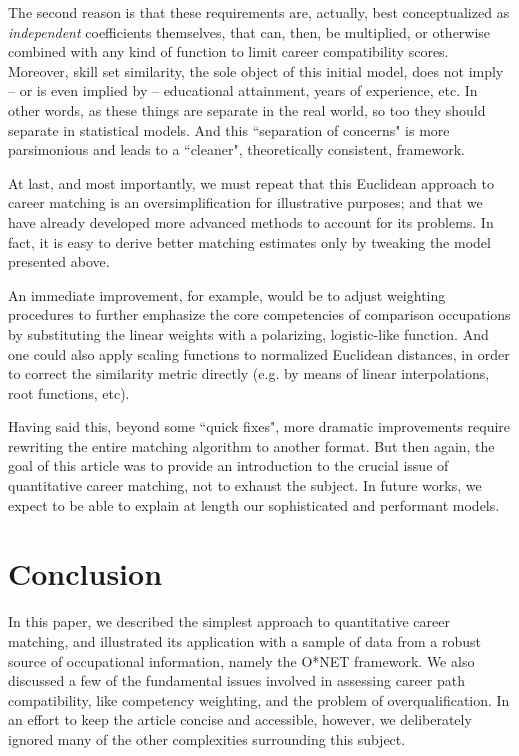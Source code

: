 \documentclass{article}
\begin{document}
The second reason is that these requirements are, actually, best conceptualized
as \textit{independent} coefficients themselves, that can, then, be multiplied,
or otherwise combined with any kind of function to limit career compatibility
scores. Moreover, skill set similarity, the sole object of this initial model,
does not imply -- or is even implied by -- educational attainment, years of
experience, etc. In other words, as these things are separate in the real
world, so too they should separate in statistical models. And this ``separation
of concerns" is more parsimonious and leads to a ``cleaner", theoretically
consistent, framework.

At last, and most importantly, we must repeat that this Euclidean approach to
career matching is an oversimplification for illustrative purposes; and that we
have already developed more advanced methods to account for its problems. In
fact, it is easy to derive better matching estimates only by tweaking the model
presented above.

An immediate improvement, for example, would be to adjust weighting procedures
to further emphasize the core competencies of comparison occupations by
substituting the linear weights with a polarizing, logistic-like function. And
one could also apply scaling functions to normalized Euclidean distances, in
order to correct the similarity metric directly (e.g. by means of linear
interpolations, root functions, etc).

Having said this, beyond some ``quick fixes", more dramatic improvements
require rewriting the entire matching algorithm to another format. But then
again, the goal of this article was to provide an introduction to the crucial
issue of quantitative career matching, not to exhaust the subject. In future
works, we expect to be able to explain at length our sophisticated and
performant models.

\section{Conclusion}
In this paper, we described the simplest approach to quantitative career
matching, and illustrated its application with a sample of data from a robust
source of occupational information, namely the O*NET framework. We also
discussed a few of the fundamental issues involved in assessing career path
compatibility, like competency weighting, and the problem of overqualification.
In an effort to keep the article concise and accessible, however, we
deliberately ignored many of the other complexities surrounding this subject.
\end{document}
